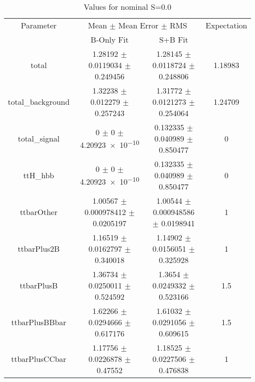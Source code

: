 \begin{table}
\centering
\caption{Values for nominal S=0.0}
\begin{tabular}{cccc}
\toprule
Parameter & \multicolumn{2}{c}{Mean $\pm$ Mean Error $\pm$ RMS} & Expectation\\
 & B-Only Fit & S+B Fit & \\
\midrule
total & \num{1.28192} $\pm$ \num{0.0119034} $\pm$ \num{0.249456} & \num{1.28145} $\pm$ \num{0.0118724} $\pm$ \num{0.248806} & \num{1.18983}\\
total\_background & \num{1.32238} $\pm$ \num{0.012279} $\pm$ \num{0.257243} & \num{1.31772} $\pm$ \num{0.0121273} $\pm$ \num{0.254064} & \num{1.24709}\\
total\_signal & \num{0} $\pm$ \num{0} $\pm$ \num{4.20923e-10} & \num{0.132335} $\pm$ \num{0.040989} $\pm$ \num{0.850477} & \num{0}\\
ttH\_hbb & \num{0} $\pm$ \num{0} $\pm$ \num{4.20923e-10} & \num{0.132335} $\pm$ \num{0.040989} $\pm$ \num{0.850477} & \num{0}\\
ttbarOther & \num{1.00567} $\pm$ \num{0.000978412} $\pm$ \num{0.0205197} & \num{1.00544} $\pm$ \num{0.000948586} $\pm$ \num{0.0198941} & \num{1}\\
ttbarPlus2B & \num{1.16519} $\pm$ \num{0.0162797} $\pm$ \num{0.340018} & \num{1.14902} $\pm$ \num{0.0156051} $\pm$ \num{0.325928} & \num{1}\\
ttbarPlusB & \num{1.36734} $\pm$ \num{0.0250011} $\pm$ \num{0.524592} & \num{1.3654} $\pm$ \num{0.0249332} $\pm$ \num{0.523166} & \num{1.5}\\
ttbarPlusBBbar & \num{1.62266} $\pm$ \num{0.0294666} $\pm$ \num{0.617176} & \num{1.61032} $\pm$ \num{0.0291056} $\pm$ \num{0.609615} & \num{1.5}\\
ttbarPlusCCbar & \num{1.17756} $\pm$ \num{0.0226878} $\pm$ \num{0.47552} & \num{1.18525} $\pm$ \num{0.0227506} $\pm$ \num{0.476838} & \num{1}\\
\bottomrule
\end{tabular}
\end{table}